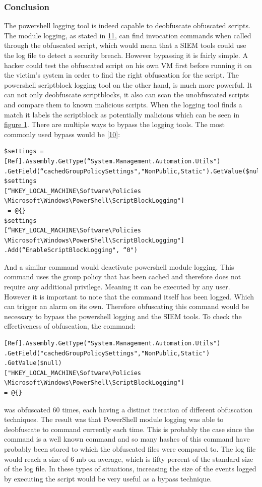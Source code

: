 \documentclass{article}%
\begin{document}
\subsubsection{Conclusion}
The powershell logging tool is indeed capable to deobfuscate obfuscated scripts. The module logging, as stated in \hyperlink{11}{11}, can find invocation commands when called through the obfuscated script, which would mean that a SIEM tools could use the log file to detect a security breach. However bypassing it is fairly simple. A hacker could test the obfuscated script on his own VM first before running it on the victim's system in order to find the right obfuscation for the script. The powershell scriptblock logging tool on the other hand, is much more powerful. It can not only deobfuscate scriptblocks, it also can scan the unobfuscated scripts and compare them to known malicious scripts. When the logging tool finds a match it labels the scriptblock as potentially malicious which can be seen in \hyperlink{fig1}{figure 1}.
There are multiple ways to bypass the logging tools. The most commonly used bypass would be [\hyperlink{10}{10}]:
\begin{verbatim}
$settings = [Ref].Assembly.GetType(“System.Management.Automation.Utils")
.GetField(“cachedGroupPolicySettings","NonPublic,Static").GetValue($null);
$settings
[“HKEY_LOCAL_MACHINE\Software\Policies
\Microsoft\Windows\PowerShell\ScriptBlockLogging"]
 = @{}
$settings
[“HKEY_LOCAL_MACHINE\Software\Policies
\Microsoft\Windows\PowerShell\ScriptBlockLogging"]
.Add(“EnableScriptBlockLogging", “0")
\end{verbatim}
And a similar command would deactivate powershell module logging. This command uses the group policy that has been cached and therefore does not require any additional privilege. Meaning it can be executed by any user. However it is important to note that the command itself has been logged. Which can trigger an alarm on its own. Therefore obfuscating this command would be necessary to bypass the powershell logging and the SIEM tools. To check the effectiveness of obfuscation, the command:
\begin{verbatim}
[Ref].Assembly.GetType("System.Management.Automation.Utils")
.GetField("cachedGroupPolicySettings","NonPublic,Static")
.GetValue($null)
["HKEY_LOCAL_MACHINE\Software\Policies
\Microsoft\Windows\PowerShell\ScriptBlockLogging"]
= @{}
\end{verbatim}
was obfuscated 60 times, each having a distinct iteration of different obfuscation techniques. The result was that PowerShell module logging was able to deobfuscate to command currently each time. This is probably the case since the command is a well known command and so many hashes of this command have probably been stored to which the obfuscated files were compared to. The log file would reach a size of $6$ mb on average, which is fifty percent of the standard size of the log file. In these types of situations, increasing the size of the events logged by executing the script would be very useful as a bypass technique.
\end{document}
